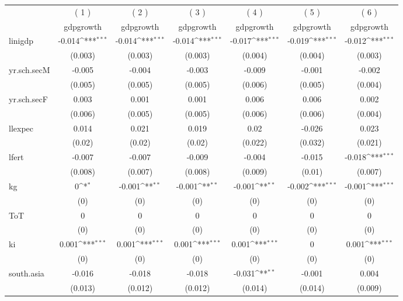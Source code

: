 \def\sym#1{\ifmmode^{#1}\else\(^{#1}\)\fi}
\begin{table}[p]
\centering
\small
\begin{tabular}{l*{6}{c}}
\hline\hline
	 &\multicolumn{1}{c}{( 1 )}  	 &\multicolumn{1}{c}{( 2 )}  	 &\multicolumn{1}{c}{( 3 )}  	 &\multicolumn{1}{c}{( 4 )}  	 &\multicolumn{1}{c}{( 5 )}  	 &\multicolumn{1}{c}{( 6 )}  \\  &\multicolumn{1}{c}{gdpgrowth} &\multicolumn{1}{c}{gdpgrowth} &\multicolumn{1}{c}{gdpgrowth} &\multicolumn{1}{c}{gdpgrowth} &\multicolumn{1}{c}{gdpgrowth} &\multicolumn{1}{c}{gdpgrowth} \\
\hline
linigdp 		&-0.014\sym{***} 		&-0.014\sym{***} 		&-0.014\sym{***} 		&-0.017\sym{***} 		&-0.019\sym{***} 		&-0.012\sym{***} \\
  		&(0.003) 		&(0.003) 		&(0.003) 		&(0.004) 		&(0.004) 		&(0.003) \\
yr.sch.secM 		&-0.005 		&-0.004 		&-0.003 		&-0.009 		&-0.001 		&-0.002 \\
  		&(0.005) 		&(0.005) 		&(0.005) 		&(0.006) 		&(0.005) 		&(0.004) \\
yr.sch.secF 		&0.003 		&0.001 		&0.001 		&0.006 		&0.006 		&0.002 \\
  		&(0.006) 		&(0.005) 		&(0.005) 		&(0.006) 		&(0.006) 		&(0.004) \\
llexpec 		&0.014 		&0.021 		&0.019 		&0.02 		&-0.026 		&0.023 \\
  		&(0.02) 		&(0.02) 		&(0.02) 		&(0.022) 		&(0.032) 		&(0.021) \\
lfert 		&-0.007 		&-0.007 		&-0.009 		&-0.004 		&-0.015 		&-0.018\sym{***} \\
  		&(0.008) 		&(0.007) 		&(0.008) 		&(0.009) 		&(0.01) 		&(0.007) \\
kg 		&0\sym{*} 		&-0.001\sym{**} 		&-0.001\sym{**} 		&-0.001\sym{**} 		&-0.002\sym{***} 		&-0.001\sym{***} \\
  		&(0) 		&(0) 		&(0) 		&(0) 		&(0) 		&(0) \\
ToT 		&0 		&0 		&0 		&0 		&0 		&0 \\
  		&(0) 		&(0) 		&(0) 		&(0) 		&(0) 		&(0) \\
ki 		&0.001\sym{***} 		&0.001\sym{***} 		&0.001\sym{***} 		&0.001\sym{***} 		&0 		&0.001\sym{***} \\
  		&(0) 		&(0) 		&(0) 		&(0) 		&(0) 		&(0) \\
south.asia 		&-0.016 		&-0.018 		&-0.018 		&-0.031\sym{**} 		&-0.001 		&0.004 \\
  		&(0.013) 		&(0.012) 		&(0.012) 		&(0.014) 		&(0.014) 		&(0.009) \\

\end{tabular}
\end{table}
